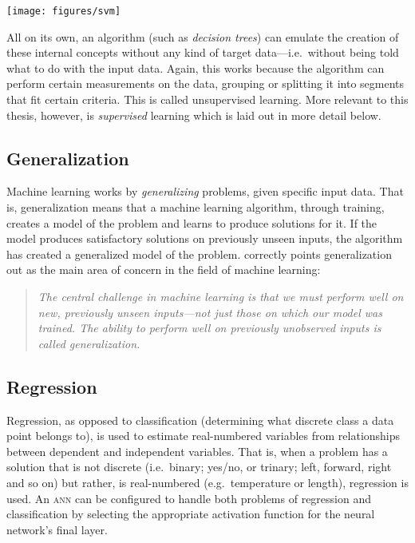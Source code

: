 \begin{multicols}{2}
\begin{Figure}
  \texttt{[image: figures/svm]}
\end{Figure}

\noindent All on its own, an algorithm (such as \textit{decision trees}) can
emulate the creation of these internal concepts without any kind of target
data---i.e.\ without being told what to do with the input data.  Again, this
works because the algorithm can perform certain measurements on the data,
grouping or splitting it into segments that fit certain criteria.  This is
called unsupervised learning.  More relevant to this thesis, however, is
\textit{supervised} learning which is laid out in more detail below.

\subsection{Generalization}

Machine learning works by \textit{generalizing} problems, given specific input
data.  That is, generalization means that a machine learning algorithm, through
training, creates a model of the problem and learns to produce solutions for it.
If the model produces satisfactory solutions on previously unseen inputs, the
algorithm has created a generalized model of the problem.
\citet[p.~110]{Goodfellow-et-al-2016} correctly points generalization out as the main
area of concern in the field of machine learning:

\blockquote{
  \slshape%
  The central challenge in machine learning is that we must perform well on new,
  previously unseen inputs---not just those on which our model was trained. The
  ability to perform well on previously unobserved inputs is called
  generalization.
}

\subsection{Regression}

Regression, as opposed to classification (determining what discrete class a data
point belongs to), is used to estimate real-numbered variables from
relationships between dependent and independent variables.  That is, when a
problem has a solution that is not discrete (i.e.\ binary; yes/no, or trinary;
left, forward, right and so on) but rather, is real-numbered (e.g.\ temperature
or length), regression is used. An \textsc{ann} can be configured to handle both
problems of regression and classification by selecting the appropriate
activation function for the neural network's final layer.


\end{multicols}
